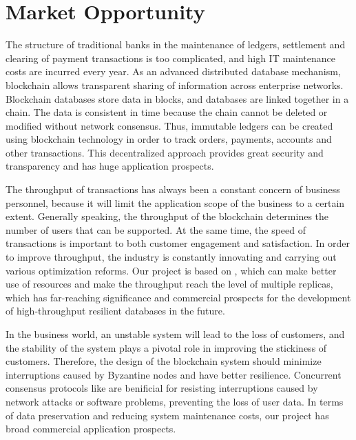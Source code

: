  \section{Market Opportunity}

 \par The structure of traditional banks in the maintenance of ledgers, settlement and clearing of payment transactions
 is too complicated, and high IT maintenance costs are incurred every year. As an advanced distributed database mechanism, 
 blockchain allows transparent sharing of information across enterprise networks. Blockchain databases store 
 data in blocks, and databases are linked together in a chain. The data is consistent in time because the chain 
 cannot be deleted or modified without network consensus. Thus, immutable ledgers can be created using 
 blockchain technology in order to track orders, payments, accounts and other transactions. This decentralized 
 approach provides great security and transparency and has huge application prospects.

 \par The throughput of transactions has always been a constant concern of business personnel, because it will limit 
 the application scope of the business to a certain extent. Generally speaking, the throughput of the blockchain 
 determines the number of users that can be supported. At the same time, the speed of transactions is important 
 to both customer engagement and satisfaction. In order to improve throughput, the industry is constantly innovating 
 and carrying out various optimization reforms. Our project is based on \RCC{}, which can make better use of resources 
 and make the throughput reach the level of multiple replicas, which has far-reaching significance and commercial 
 prospects for the development of high-throughput resilient databases in the future.

 \par In the business world, an unstable system will lead to the loss of customers, and the stability of the system 
 plays a pivotal role in improving the stickiness of customers. Therefore, the design of the blockchain system should 
 minimize interruptions caused by Byzantine nodes and have better resilience. Concurrent consensus protocols like \RCC{} 
 are benificial for resisting interruptions caused by network attacks or software problems, preventing the loss of user data. 
 In terms of data preservation and reducing system maintenance costs, our project has broad commercial application 
 prospects.
